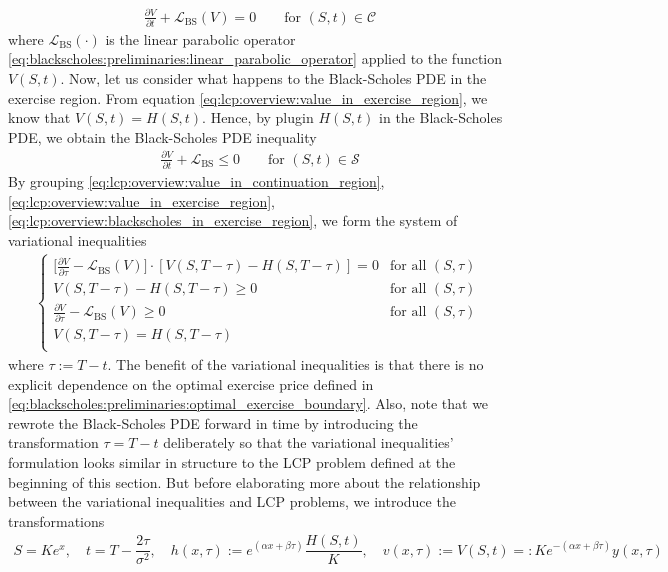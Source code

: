 \begin{align*}
    \frac{\partial{V}}{\partial{t}} + \mathcal{L}_{\text{BS}}(V) = 0 \qquad \text{for $(S,t) \in \mathcal{C}$}
\end{align*}
where $\mathcal{L}_{\text{BS}}(\cdot)$ is the linear parabolic operator \eqref{eq:blackscholes:preliminaries:linear_parabolic_operator} applied to the function $V(S,t)$. Now, let us consider what happens to the Black-Scholes PDE in the exercise region. From equation \eqref{eq:lcp:overview:value_in_exercise_region}, we know that $V(S,t)=H(S,t)$. Hence, by plugin $H(S,t)$ in the Black-Scholes PDE, we obtain the Black-Scholes PDE inequality
\begin{align}
    \label{eq:lcp:overview:blackscholes_in_exercise_region}
    \frac{\partial{V}}{\partial{t}} + \mathcal{L}_{\text{BS}} \le 0 \qquad \text{for $(S,t) \in \mathcal{S}$}
\end{align}
By grouping \eqref{eq:lcp:overview:value_in_continuation_region}, \eqref{eq:lcp:overview:value_in_exercise_region}, \eqref{eq:lcp:overview:blackscholes_in_exercise_region}, we form the system of variational inequalities
\begin{align}
  \begin{cases}
    \big[\frac{\partial V}{\partial \tau} - \mathcal{L}_{\text{BS}}(V)\big] \cdot [V(S,T-\tau) - H(S,T-\tau)] = 0 & \text{for all $(S,\tau)$} \\
    V(S, T-\tau) - H(S, T-\tau) \ge 0 & \text{for all $(S,\tau) \ $}\\
    \frac{\partial V}{\partial \tau} - \mathcal{L}_{\text{BS}}(V) \ge 0 &  \text{for all $(S,\tau)$}\\
    V(S, T -\tau) = H(S, T - \tau) \\  
  \end{cases}
  \label{eq:lcp:overview:variational_inequalities}
\end{align}
where $\tau := T - t$. The benefit of the variational inequalities is that there is no explicit dependence on the optimal exercise price defined in \eqref{eq:blackscholes:preliminaries:optimal_exercise_boundary}. Also, note that we rewrote the Black-Scholes PDE forward in time by introducing the transformation $\tau = T - t$ deliberately so that the variational inequalities' formulation looks similar in structure to the LCP problem defined at the beginning of this section. But before elaborating more about the relationship between the variational inequalities and LCP problems, we introduce the transformations
\begin{align}
\label{eq:lcp:overview:heat_diffusion_domain_transformation}
S = Ke^x, \quad t = T - \dfrac{2\tau}{\sigma^2},\quad h(x,\tau) := e^{(\alpha x + \beta \tau)}\dfrac{H(S,t)}{K}, \quad v(x, \tau) := V(S, t) =: Ke^{-(\alpha x + \beta \tau)}y(x, \tau)
\end{align}
